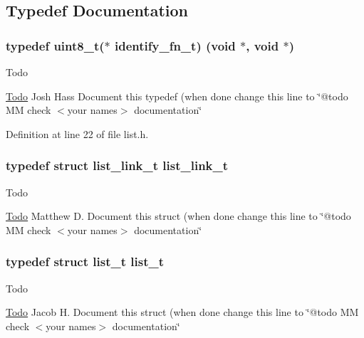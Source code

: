 \subsection{Typedef Documentation}
\hypertarget{group__list_ga608e5ebc97d34a9cd07a2c44925a1dc2}{}
\subsubsection[{identify\+\_\+fn\+\_\+t}]{\setlength{\rightskip}{0pt plus 5cm}typedef uint8\+\_\+t($\ast$ identify\+\_\+fn\+\_\+t) (void $\ast$, void $\ast$)}\label{group__list_ga608e5ebc97d34a9cd07a2c44925a1dc2}
\begin{DoxyRefDesc}{Todo}
\item[\hyperlink{todo__todo000010}{Todo}]Josh Hass Document this typedef (when done change this line to \char`\"{}@todo M\+M check $<$your names$>$ documentation\char`\"{} \end{DoxyRefDesc}


Definition at line 22 of file list.\+h.

\hypertarget{group__list_ga072d443e962ee5e68a26011a5089325c}{}
\subsubsection[{list\+\_\+link\+\_\+t}]{\setlength{\rightskip}{0pt plus 5cm}typedef struct {\bf list\+\_\+link\+\_\+t}  {\bf list\+\_\+link\+\_\+t}}\label{group__list_ga072d443e962ee5e68a26011a5089325c}
\begin{DoxyRefDesc}{Todo}
\item[\hyperlink{todo__todo000011}{Todo}]Matthew D. Document this struct (when done change this line to \char`\"{}@todo M\+M check $<$your names$>$ documentation\char`\"{} \end{DoxyRefDesc}
\hypertarget{group__list_gac466ff011100add5899254ca98ff8b93}{}
\subsubsection[{list\+\_\+t}]{\setlength{\rightskip}{0pt plus 5cm}typedef struct {\bf list\+\_\+t}  {\bf list\+\_\+t}}\label{group__list_gac466ff011100add5899254ca98ff8b93}
\begin{DoxyRefDesc}{Todo}
\item[\hyperlink{todo__todo000012}{Todo}]Jacob H. Document this struct (when done change this line to \char`\"{}@todo M\+M check $<$your names$>$ documentation\char`\"{} \end{DoxyRefDesc}
\hypertarget{group__list_gaec41fb00279c4e4ec77286fa803cbcd2}{}
